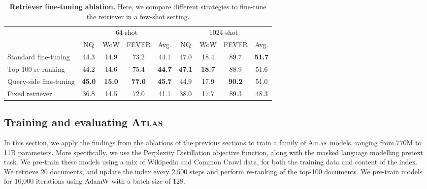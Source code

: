 \documentclass[10pt]{article} \usepackage[preprint]{tmlr}
\newcommand{\Atlas}{\textsc{Atlas}}
\begin{document}
\begin{table}
  \centering
  \caption{\textbf{Retriever fine-tuning ablation.} Here, we compare different strategies to fine-tune the retriever in a few-shot setting.}
  \vspace{0.5em}
  \label{table:finetuning_ablation}
  \begin{tabular}{l cccc cccc}
    \toprule
    & \multicolumn{4}{c}{64-shot} & \multicolumn{4}{c}{1024-shot} \\
    \cmidrule(lr){2-5} \cmidrule(lr){6-9}
    & NQ & WoW & FEVER & Avg. & NQ & WoW & FEVER & Avg. \\
    \midrule
    Standard fine-tuning   & 44.3 & 14.9 & 73.2 & 44.1 & 47.0 & 18.4 & 89.7 & \textbf{51.7} \\
    Top-100 re-ranking     & 44.2 & 14.6 & 75.4 & \textbf{44.7} & \textbf{47.1} & \textbf{18.7} & 88.9 & 51.6 \\
    Query-side fine-tuning & \textbf{45.0} & \textbf{15.0} & \textbf{77.0} & \textbf{45.7} &   44.9 & 17.9 & \textbf{90.2} & 51.0  \\
    Fixed retriever        & 36.8 & 14.5 & 72.0 & 41.1 & 38.0 & 17.7 & 89.3 & 48.3  \\
\bottomrule
  \end{tabular}
\end{table}

\subsection{Training and evaluating \Atlas}
\label{sec:final}
In this section, we apply the findings from the ablations of the previous sections to train a family of \Atlas~models, ranging from 770M to 11B parameters.
More specifically, we use the Perplexity Distillation objective function, along with the masked language modelling pretext task.
We pre-train these models using a mix of Wikipedia and Common Crawl data, for both the training data and content of the index.
We retrieve 20 documents, and update the index every 2,500 steps and perform re-ranking of the top-100 documents.
We pre-train models for 10,000 iterations using AdamW with a batch size of 128.
\end{document}
